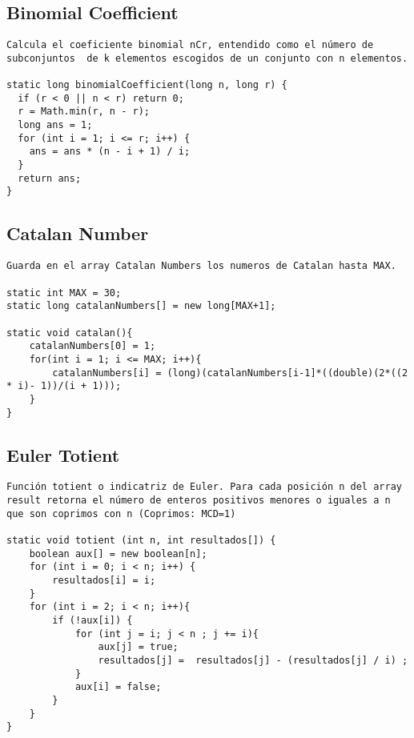 \documentclass[10pt,letterpaper,twocolumn,twosided]{article}
\begin{document}
\subsection{Binomial Coefficient}
\begin{lstlisting}
Calcula el coeficiente binomial nCr, entendido como el número de subconjuntos  de k elementos escogidos de un conjunto con n elementos.

static long binomialCoefficient(long n, long r) {
  if (r < 0 || n < r) return 0; 
  r = Math.min(r, n - r);
  long ans = 1;
  for (int i = 1; i <= r; i++) {
    ans = ans * (n - i + 1) / i;
  }
  return ans;
}
\end{lstlisting}

\subsection{Catalan Number}
\begin{lstlisting}
Guarda en el array Catalan Numbers los numeros de Catalan hasta MAX.

static int MAX = 30;
static long catalanNumbers[] = new long[MAX+1];

static void catalan(){
	catalanNumbers[0] = 1;
	for(int i = 1; i <= MAX; i++){
		catalanNumbers[i] = (long)(catalanNumbers[i-1]*((double)(2*((2 * i)- 1))/(i + 1)));
	}
}
\end{lstlisting}

\subsection{Euler Totient}
\begin{lstlisting}
Función totient o indicatriz de Euler. Para cada posición n del array result retorna el número de enteros positivos menores o iguales a n que son coprimos con n (Coprimos: MCD=1)

static void totient (int n, int resultados[]) {
	boolean aux[] = new boolean[n];
	for (int i = 0; i < n; i++) {
		resultados[i] = i;
	}
	for (int i = 2; i < n; i++){
		if (!aux[i]) {
			for (int j = i; j < n ; j += i){
				aux[j] = true;
				resultados[j] =  resultados[j] - (resultados[j] / i) ;
			}
			aux[i] = false;
		}
	}
}
\end{lstlisting}
\end{document}
